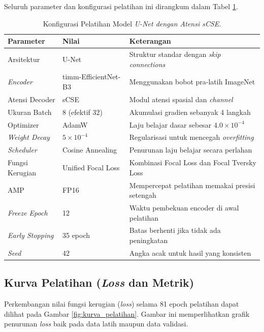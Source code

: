 \documentclass[12pt,a4paper,oneside]{book}
\begin{document}
Seluruh parameter dan konfigurasi pelatihan ini dirangkum dalam Tabel \ref{tab:training_config_bab4}.

\begin{table}[htbp]
  \centering
  \caption{Konfigurasi Pelatihan Model \textit{U-Net dengan Atensi sCSE}.}
  \label{tab:training_config_bab4}
  \begin{tabularx}{\textwidth}{llX}
    \toprule
    \textbf{Parameter} & \textbf{Nilai} & \textbf{Keterangan} \\
    \midrule
    Arsitektur         & U-Net         & Struktur standar dengan \textit{skip connections} \\
    \textit{Encoder}   & timm-EfficientNet-B3 & Menggunakan bobot pra-latih ImageNet \\
    Atensi Decoder     & sCSE           & Modul atensi spasial dan \textit{channel} \\
    Ukuran Batch       & 8 (efektif 32) & Akumulasi gradien sebanyak 4 langkah \\
    Optimizer          & AdamW          & Laju belajar dasar sebesar $4.0 \times 10^{-4}$ \\
    \textit{Weight Decay} & $5 \times 10^{-4}$   & Regularisasi untuk mencegah \textit{overfitting} \\
    \textit{Scheduler} & Cosine Annealing & Penurunan laju belajar secara perlahan \\
    Fungsi Kerugian    & Unified Focal Loss & Kombinasi Focal Loss dan Focal Tversky Loss \\
    AMP                & FP16           & Mempercepat pelatihan memakai presisi setengah \\
    \textit{Freeze Epoch} & 12           & Waktu pembekuan encoder di awal pelatihan \\
    \textit{Early Stopping} & 35 epoch  & Batas berhenti jika tidak ada peningkatan \\
    \textit{Seed}      & 42             & Angka acak untuk hasil yang konsisten \\
    \bottomrule
  \end{tabularx}
\end{table}

\subsection{Kurva Pelatihan (\textit{Loss} dan Metrik)}

Perkembangan nilai fungsi kerugian (\textit{loss}) selama 81 epoch pelatihan dapat dilihat pada Gambar \ref{fig:kurva_pelatihan}. Gambar ini memperlihatkan grafik penurunan \textit{loss} baik pada data latih maupun data validasi.
\end{document}

